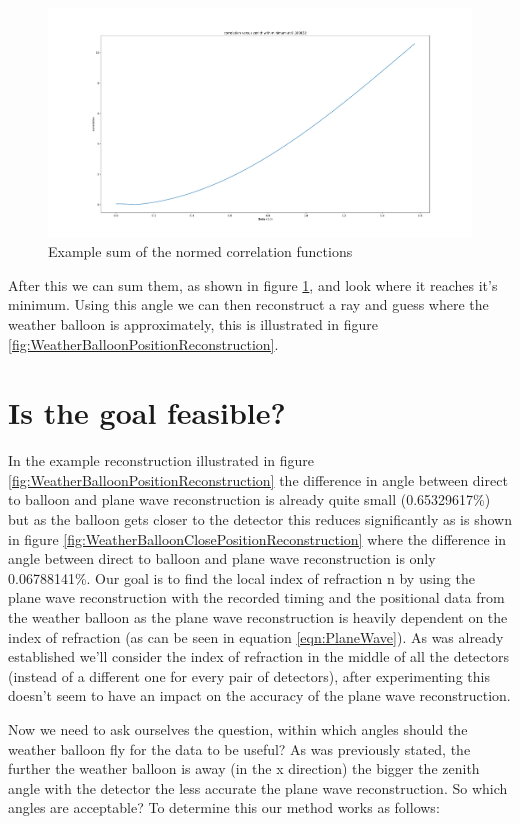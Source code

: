 \documentclass[11pt,a4paper,faculty=we,language=en,doctype=report]{cls/ugent-doc}
\begin{document}
\begin{figure}
	\centering
	\includegraphics[width=\textwidth]{SummedCorrelation.pdf}
	\caption{Example sum of the normed correlation functions}
	\label{fig:SummedCorrelation}
\end{figure}
After this we can sum them, as shown in figure \ref{fig:SummedCorrelation}, and look
where it reaches it's minimum. Using this angle we can then reconstruct a ray and guess 
where the weather balloon is approximately, this is illustrated in figure 
\ref{fig:WeatherBalloonPositionReconstruction}. 
\section{Is the goal feasible?}
In the example reconstruction illustrated in figure \ref{fig:WeatherBalloonPositionReconstruction} the difference in 
angle between direct to balloon and plane wave reconstruction is already quite small (0.65329617\%)
but as the balloon gets closer to the detector this reduces significantly as is shown in figure
\ref{fig:WeatherBalloonClosePositionReconstruction} where the difference in angle between direct 
to balloon and plane wave reconstruction is only 0.06788141\%. Our goal is to find the local index
of refraction n by using the plane wave reconstruction with the recorded timing and the positional data from the weather
balloon as the plane wave reconstruction is heavily dependent on the index
of refraction (as can be seen in equation \ref{eqn:PlaneWave}). As was already established we'll consider
the index of refraction in the middle of all the detectors (instead of a different one for every pair of
detectors), after experimenting this doesn't seem to have an impact on the accuracy of the plane wave reconstruction. 

Now we need to ask ourselves the question, within which angles should the
weather balloon fly for the data to be useful?  As was previously stated, the
further the weather balloon is away (in the x direction) the bigger the zenith
angle with the detector the less accurate the plane wave reconstruction.  So
which angles are acceptable? To determine this our method works as follows: 
\end{document}
